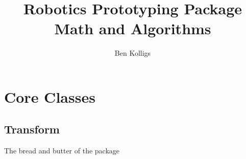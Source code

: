 \documentclass[12pt]{article}
\title{Robotics Prototyping Package Math and Algorithms}
\author{Ben Kolligs}
\date{}
\begin{document}
	\maketitle
	\tableofcontents
	\section{Core Classes}
	\subsection{Transform}
	The bread and butter of the package
\end{document}

